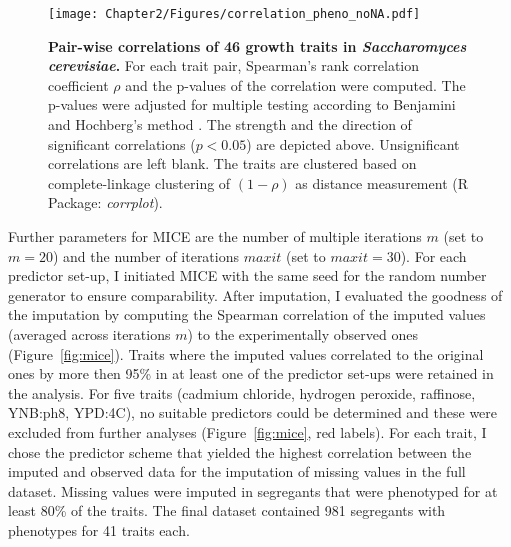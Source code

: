 \begin{figure}[hbtp]
	\centering
	\texttt{[image: Chapter2/Figures/correlation\_pheno\_noNA.pdf]}
	\caption[Pairwise correlations of 46 growth traits in \emph{Saccharomyces cerevisiae}]{\textbf{Pair-wise correlations of 46 growth traits in \emph{Saccharomyces cerevisiae}.} For each trait pair, Spearman's rank correlation coefficient \(\rho\) and the p-values of the correlation were computed. The p-values were adjusted for multiple testing according to Benjamini and Hochberg's method \citep{Benjamini1995}. The strength and the direction of significant correlations (\(p < 0.05\)) are depicted above. Unsignificant correlations are left blank. The traits are clustered based on complete-linkage clustering of \((1-\rho)\) as distance measurement (R Package: \emph{corrplot}).}
 	\label{fig:traitcorrelations}
\end{figure}

Further parameters for MICE are the number of multiple iterations \(m\) (set to \(m=20\)) and the number of iterations \(maxit\) (set to \(maxit=30\)). For each predictor set-up, I initiated MICE with the same seed for the random number generator to ensure comparability. After imputation, I evaluated the goodness of the imputation  by computing the Spearman correlation of the imputed values (averaged across iterations \(m\)) to the experimentally observed ones (Figure~\ref{fig:mice}). Traits where the imputed values correlated to the original ones by more then 95\% in at least one of the predictor set-ups were retained in the analysis. For five traits (cadmium chloride, hydrogen peroxide, raffinose, YNB:ph8, YPD:4C), no suitable predictors could be determined and these were excluded from further analyses (Figure~\ref{fig:mice}, red labels). For each trait, I chose the predictor scheme that yielded the highest correlation between the imputed and observed data for the imputation of missing values in the full dataset. Missing values were imputed in segregants that were phenotyped for at least 80\% of the traits. The final dataset contained 981 segregants with phenotypes for 41 traits each. 
 	
